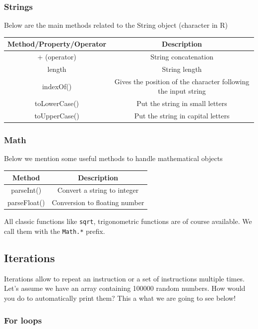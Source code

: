 \documentclass[
]{book}
\begin{document}
\hypertarget{strings}{%
\subsubsection{Strings}\label{strings}}

Below are the main methods related to the String object (character in R)

\begin{longtable}[]{@{}cc@{}}
\toprule
Method/Property/Operator & Description\tabularnewline
\midrule
\endhead
+ (operator) & String concatenation\tabularnewline
length & String length\tabularnewline
indexOf() & Gives the position of the character following the input string\tabularnewline
toLowerCase() & Put the string in small letters\tabularnewline
toUpperCase() & Put the string in capital letters\tabularnewline
\bottomrule
\end{longtable}

\hypertarget{math}{%
\subsubsection{Math}\label{math}}

Below we mention some useful methods to handle mathematical objects

\begin{longtable}[]{@{}cc@{}}
\toprule
Method & Description\tabularnewline
\midrule
\endhead
parseInt() & Convert a string to integer\tabularnewline
parseFloat() & Conversion to floating number\tabularnewline
\bottomrule
\end{longtable}

All classic functions like \texttt{sqrt}, trigonometric functions are of course available. We call them with the \texttt{Math.*} prefix.

\hypertarget{iterations}{%
\subsection{Iterations}\label{iterations}}

Iterations allow to repeat an instruction or a set of instructions multiple times. Let's assume we have an array containing 100000 random numbers. How would you do to automatically print them? This a what we are going to see below!

\hypertarget{for-loops}{%
\subsubsection{For loops}\label{for-loops}}
\end{document}
